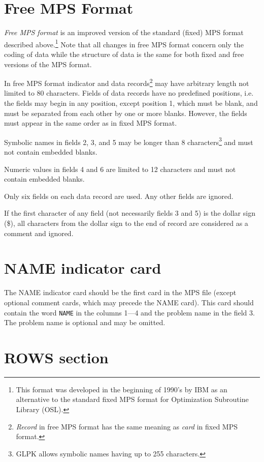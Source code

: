 \section{Free MPS Format}

{\it Free MPS format} is an improved version of the standard (fixed)
MPS format described above.\footnote{This format was developed in the
beginning of 1990's by IBM as an alternative to the standard fixed MPS
format for Optimization Subroutine Library (OSL).} Note that all
changes in free MPS format concern only the coding of data while the
structure of data is the same for both fixed and free versions of the
MPS format.

In free MPS format indicator and data records\footnote{{\it Record} in
free MPS format has the same meaning as {\it card} in fixed MPS format.}
may have arbitrary length not limited to 80 characters. Fields of data
records have no predefined positions, i.e. the fields may begin in any
position, except position 1, which must be blank, and must be separated
from each other by one or more blanks. However, the fields must appear
in the same order as in fixed MPS format.


Symbolic names in fields 2, 3, and 5 may be longer than 8
characters\footnote{GLPK allows symbolic names having up to 255
characters.} and must not contain embedded blanks.

Numeric values in fields 4 and 6 are limited to 12 characters and must
not contain embedded blanks.

Only six fields on each data record are used. Any other fields are
ignored.

If the first character of any field (not necessarily fields 3 and 5)
is the dollar sign (\$), all characters from the dollar sign to the end
of record are considered as a comment and ignored.

\newpage

\section{NAME indicator card}

The NAME indicator card should be the first card in the MPS file
(except optional comment cards, which may precede the NAME card). This
card should contain the word \verb|NAME| in the columns 1---4 and the
problem name in the field 3. The problem name is optional and may be
omitted.

\section{ROWS section}
\label{secrows}

